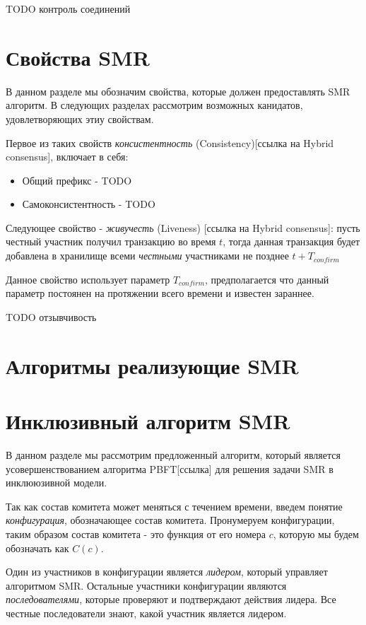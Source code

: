 TODO контроль соединений

\section{Свойства SMR}
В данном разделе мы обозначим свойства, которые должен предоставлять SMR алгоритм.
В следующих разделах рассмотрим возможных канидатов, удовлетворяющих этиу свойствам.

Первое из таких свойств \textit{консистентность} (Consistency)[ссылка на Hybrid consensus], включает в себя:
\begin{itemize}
\item Общий префикс - TODO
\item Самоконсистентность - TODO
\end{itemize}

\noindent Следующее свойство - \textit{живучесть} (Liveness) [ссылка на Hybrid consensus]:
пусть честный участник получил транзакцию во время $t$, тогда данная транзакция будет добавлена в хранилище всеми \textit{честными} участниками не позднее $t + T_{confirm}$

Данное свойство использует параметр $T_{confirm}$, предполагается что данный параметр постоянен на протяжении всего времени и известен зараннее.

TODO отзывчивость

\section{Алгоритмы реализующие SMR}

\section{Инклюзивный алгоритм SMR}
В данном разделе мы рассмотрим предложенный алгоритм, 
который является усовершенствованием алгоритма PBFT[ссылка] для решения задачи SMR в инклююзивной модели.
 
Так как состав комитета может меняться с течением времени, введем понятие \textit{конфигурация}, обозначающее состав комитета. Пронумеруем конфигурации, таким образом состав комитета - это функция от его номера $c$, которую мы будем обозначать как $C(c)$. 
 
Один из участников в конфигурации является \textit{лидером}, который управляет алгоритмом SMR. 
Остальные участники конфигурации являются \textit{последователями}, которые проверяют и подтверждают действия лидера. Все честные последователи знают, какой участник является лидером.


